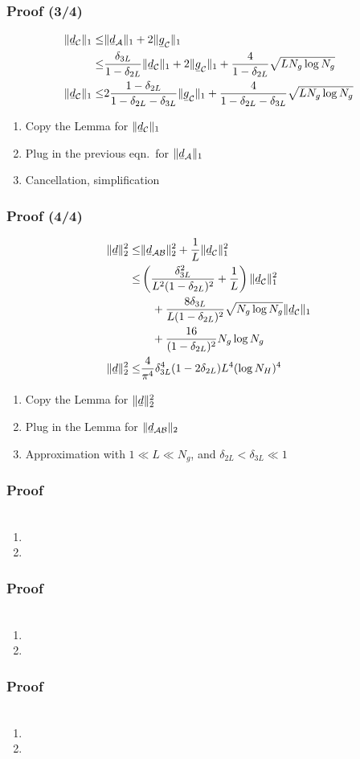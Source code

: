 \documentclass{beamer}
\newcommand{\Disp}[1]{\begin{align} #1 \end{align}}
\newcommand{\NT}{\notag}
\renewcommand{\d}{\delta}
\newcommand{\I}{\item}
\newcommand{\MC}[1]{\mathcal{#1}}
\newcommand{\R}[1]{\sqrt{#1}}
\newcommand{\F}[1]{\frac{#1}}
\newcommand{\V}[1]{\stackunder[1.2pt]{$#1$}{\rule{.9ex}{.075ex}}}
\begin{document}
\begin{frame}
\frametitle{Proof (3/4)}
\Disp{
\| \V{d}_{\MC{C}} \|_1
\leq &\| \V{d}_{\MC{A}} \|_1 +2 \| \V{g}_{\MC{C}} \|_1 \NT \\
\leq &\F {\d_{3L}} {1-\d_{2L}} \| \V{d}_{\MC{C}} \|_1
+2 \| \V{g}_{\MC{C}} \|_1
+\F {4} {1-\d_{2L}} \R{L N_g \log N_g} \\
\| \V{d}_{\MC{C}} \|_1
\leq &2 \F{1-\d_{2L}} {1 -\d_{2L} -\d_{3L}} \| \V{g}_{\MC{C}} \|_1
+\F {4} {1-\d_{2L} -\d_{3L}} \R{L N_g \log N_g}
}
\begin{enumerate}
\I Copy the Lemma for \(\| \V{d}_{\MC{C}} \|_1\)
\I Plug in the previous eqn.\ for \(\| \V{d}_{\MC{A}} \|_1\)
\I Cancellation, simplification
\end{enumerate}
\end{frame}

\begin{frame}
\frametitle{Proof (4/4)}
\Disp{
\| \V{d} \|_2^2
\leq &\|\V{d}_{\MC{A}\MC{B}}\|_2^2 +\F{1}{L} \|\V{d}_{\MC{C}}\|_1^2 \NT \\
\leq & \left( \F{\d_{3L}^2} {L^2 (1-\d_{2L})^2} +\F{1}{L} \right) \|\V{d}_{\MC{C}}\|_1^2 \NT \\
&\quad +\F{8 \d_{3L}} {L (1-\d_{2L})^2} \R{N_g \log N_g} \|\V{d}_{\MC{C}}\|_1 \NT \\
&\quad +\F{16}{(1-\d_{2L})^2} N_g \log N_g \\
\|\V{d}\|_2^2
\leq &\F{4}{\pi^4} \d_{3L}^4 (1-2\d_{2L}) L^4 ( \log N_H )^4
}
\begin{enumerate}
\I Copy the Lemma for \(\| \V{d} \|_2^2\)
\I Plug in the Lemma for \(\|\V{d}_{\MC{A}\MC{B}}\|_2\)
\I Approximation with \(1 \ll L \ll N_g\), and \(\d_{2L} <\d_{3L} \ll 1\)
\end{enumerate}
\end{frame}

\begin{frame}
\frametitle{Proof}
\Disp{
}
\begin{enumerate}
\I 
\I 
\end{enumerate}
\end{frame}

\begin{frame}
\frametitle{Proof}
\Disp{
}
\begin{enumerate}
\I 
\I 
\end{enumerate}
\end{frame}

\begin{frame}
\frametitle{Proof}
\Disp{
}
\begin{enumerate}
\I 
\I 
\end{enumerate}
\end{frame}
\end{document}
